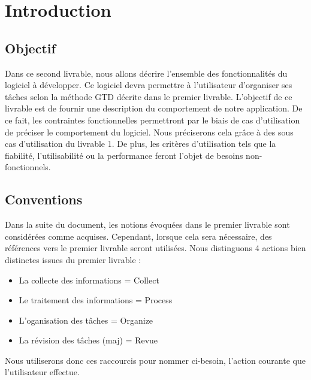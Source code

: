 \chapter{Introduction}


\section{Objectif}
Dans ce second livrable, nous allons décrire l'ensemble des fonctionnalités du logiciel à développer. Ce logiciel devra permettre à l'utilisateur d'organiser ses tâches selon la méthode GTD décrite dans le premier livrable.
L'objectif de ce livrable est de fournir une description du comportement de notre application. De ce fait, les contraintes fonctionnelles permettront par le biais de cas d'utilisation de préciser le comportement du logiciel. Nous préciserons cela grâce à des sous cas d'utilisation du livrable 1. De plus, les critères d'utilisation tels que la fiabilité, l'utilisabilité ou la performance feront l'objet de besoins non-fonctionnels.

\section{Conventions}
Dans la suite du document, les notions évoquées dans le premier livrable sont considérées comme acquises. Cependant, lorsque cela sera nécessaire, des références vers le premier livrable seront utilisées. Nous distinguons 4 actions bien distinctes issues du premier livrable :\\

\begin{itemize}
\item La collecte des informations =  Collect
\item Le traitement des informations =  Process
\item L'oganisation des tâches = Organize
\item La révision des tâches (maj) = Revue
\end{itemize}

\medskip

Nous utiliserons donc ces raccourcis pour nommer ci-besoin, l'action courante que l'utilisateur effectue.

